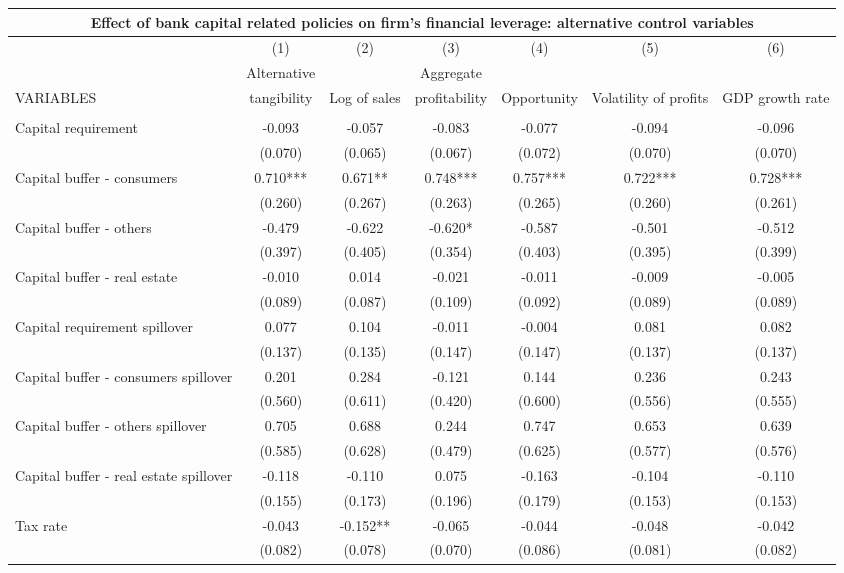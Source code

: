 \begin{tabular}{lcccccc}
\multicolumn{7}{c}{Effect of bank capital related policies on firm's financial leverage: alternative control variables} \\ \hline
 & (1) & (2) & (3) & (4) & (5) & (6) \\
 & Alternative &  & Aggregate &  &  &  \\
VARIABLES & tangibility & Log of sales & profitability & Opportunity & Volatility of profits & GDP growth rate \\ \hline
 &  &  &  &  &  &  \\
Capital requirement & -0.093 & -0.057 & -0.083 & -0.077 & -0.094 & -0.096 \\
 & (0.070) & (0.065) & (0.067) & (0.072) & (0.070) & (0.070) \\
Capital buffer - consumers & 0.710*** & 0.671** & 0.748*** & 0.757*** & 0.722*** & 0.728*** \\
 & (0.260) & (0.267) & (0.263) & (0.265) & (0.260) & (0.261) \\
Capital buffer - others & -0.479 & -0.622 & -0.620* & -0.587 & -0.501 & -0.512 \\
 & (0.397) & (0.405) & (0.354) & (0.403) & (0.395) & (0.399) \\
Capital buffer - real estate & -0.010 & 0.014 & -0.021 & -0.011 & -0.009 & -0.005 \\
 & (0.089) & (0.087) & (0.109) & (0.092) & (0.089) & (0.089) \\
Capital requirement spillover & 0.077 & 0.104 & -0.011 & -0.004 & 0.081 & 0.082 \\
 & (0.137) & (0.135) & (0.147) & (0.147) & (0.137) & (0.137) \\
Capital buffer - consumers spillover & 0.201 & 0.284 & -0.121 & 0.144 & 0.236 & 0.243 \\
 & (0.560) & (0.611) & (0.420) & (0.600) & (0.556) & (0.555) \\
Capital buffer - others spillover & 0.705 & 0.688 & 0.244 & 0.747 & 0.653 & 0.639 \\
 & (0.585) & (0.628) & (0.479) & (0.625) & (0.577) & (0.576) \\
Capital buffer - real estate spillover & -0.118 & -0.110 & 0.075 & -0.163 & -0.104 & -0.110 \\
 & (0.155) & (0.173) & (0.196) & (0.179) & (0.153) & (0.153) \\
Tax rate & -0.043 & -0.152** & -0.065 & -0.044 & -0.048 & -0.042 \\
 & (0.082) & (0.078) & (0.070) & (0.086) & (0.081) & (0.082) \\

\end{tabular}

